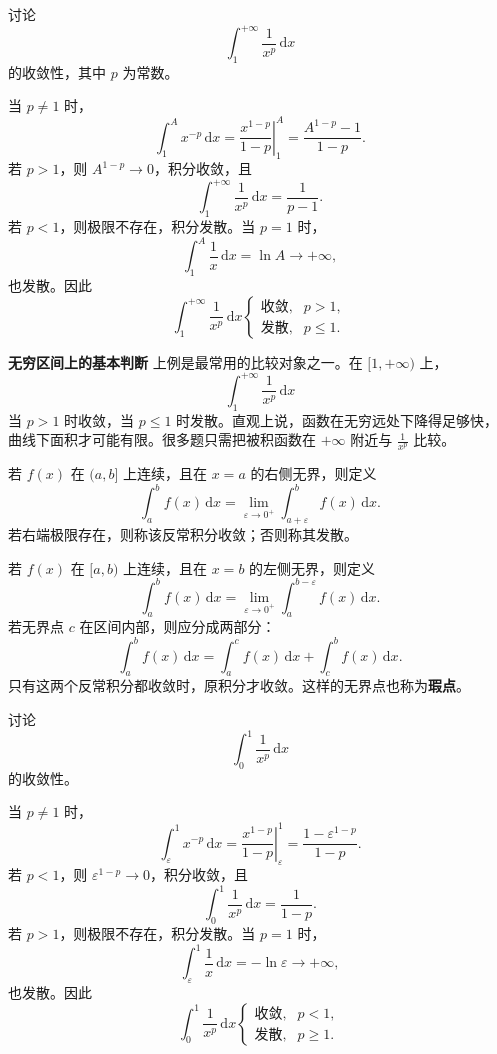 \documentclass[fontset=fandol]{ctexart}
\newenvironment{custom}[1]{\par\noindent\textbf{#1}\quad}{\par\vspace{0.8em}}
\newcommand{\dd}{\mathrm{d}}
\begin{document}
\begin{example}[$p$ 型无穷积分]
讨论
\[
\int_1^{+\infty}\frac1{x^p}\,\dd x
\]
的收敛性，其中 $p$ 为常数。

当 $p\neq1$ 时，
\[
\int_1^A x^{-p}\,\dd x
=\left.\frac{x^{1-p}}{1-p}\right|_1^A
=\frac{A^{1-p}-1}{1-p}.
\]
若 $p>1$，则 $A^{1-p}\to0$，积分收敛，且
\[
\int_1^{+\infty}\frac1{x^p}\,\dd x=\frac1{p-1}.
\]
若 $p<1$，则极限不存在，积分发散。当 $p=1$ 时，
\[
\int_1^A\frac1x\,\dd x=\ln A\to+\infty,
\]
也发散。因此
\[
\int_1^{+\infty}\frac1{x^p}\,\dd x
\begin{cases}
\text{收敛},&p>1,\\
\text{发散},&p\leq1.
\end{cases}
\]
\end{example}

\begin{custom}{无穷区间上的基本判断}
上例是最常用的比较对象之一。在 $[1,+\infty)$ 上，
\[
\int_1^{+\infty}\frac1{x^p}\,\dd x
\]
当 $p>1$ 时收敛，当 $p\leq1$ 时发散。直观上说，函数在无穷远处下降得足够快，曲线下面积才可能有限。很多题只需把被积函数在 $+\infty$ 附近与 $\frac1{x^p}$ 比较。
\end{custom}

\begin{definition}[无界函数的反常积分]
若 $f(x)$ 在 $(a,b]$ 上连续，且在 $x=a$ 的右侧无界，则定义
\[
\int_a^b f(x)\,\dd x
=\lim_{\varepsilon\to0^+}\int_{a+\varepsilon}^b f(x)\,\dd x.
\]
若右端极限存在，则称该反常积分收敛；否则称其发散。

若 $f(x)$ 在 $[a,b)$ 上连续，且在 $x=b$ 的左侧无界，则定义
\[
\int_a^b f(x)\,\dd x
=\lim_{\varepsilon\to0^+}\int_a^{b-\varepsilon} f(x)\,\dd x.
\]
若无界点 $c$ 在区间内部，则应分成两部分：
\[
\int_a^b f(x)\,\dd x
=\int_a^c f(x)\,\dd x+\int_c^b f(x)\,\dd x.
\]
只有这两个反常积分都收敛时，原积分才收敛。这样的无界点也称为\textbf{瑕点}。
\end{definition}

\begin{example}[$p$ 型瑕积分]
讨论
\[
\int_0^1\frac1{x^p}\,\dd x
\]
的收敛性。

当 $p\neq1$ 时，
\[
\int_\varepsilon^1x^{-p}\,\dd x
=\left.\frac{x^{1-p}}{1-p}\right|_{\varepsilon}^{1}
=\frac{1-\varepsilon^{1-p}}{1-p}.
\]
若 $p<1$，则 $\varepsilon^{1-p}\to0$，积分收敛，且
\[
\int_0^1\frac1{x^p}\,\dd x=\frac1{1-p}.
\]
若 $p>1$，则极限不存在，积分发散。当 $p=1$ 时，
\[
\int_\varepsilon^1\frac1x\,\dd x=-\ln\varepsilon\to+\infty,
\]
也发散。因此
\[
\int_0^1\frac1{x^p}\,\dd x
\begin{cases}
\text{收敛},&p<1,\\
\text{发散},&p\geq1.
\end{cases}
\]
\end{example}
\end{document}
